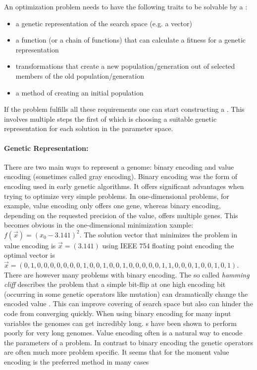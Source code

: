 An optimization problem needs to have the following traits to be solvable by a \ga:
\begin{itemize}
\item a genetic representation of the search space (e.g. a vector)
\item a function (or a chain of functions) that can calculate a fitness for a genetic representation
\item transformations that create a new population/generation out of selected members of the old population/generation
\item a method of creating an initial population
\end{itemize}


If the problem fulfills all these requirements one can start constructing a \ga. This involves multiple steps the first of which is choosing a suitable genetic representation for each solution in the parameter space. 

\paragraph{Genetic Representation:}
There are two main ways to represent a genome: binary encoding and value encoding (sometimes called gray encoding). Binary encoding was the form of encoding  used in early genetic algorithms. It offers significant advantages when trying to optimize very simple problems. In one-dimensional problems, for example, value encoding only offers one gene, whereas binary encoding, depending on the requested precision of the value, offers multiple genes. This becomes obvious in the one-dimensional minimization xample: $f(\vec{x})=(x_0 - 3.141)^2$. The solution vector that minimizes the problem in value encoding is $\vec{x} = (3.141)$ using IEEE 754 floating point encoding the optimal vector is $\vec{x}=(0,1,0,0,0,0,0,0,0,1,0,0,1,0,0,1,0,0,0,0,0,1,1,0,0,0,1,0,0,1,0,1)$.
There are however many problems with binary encoding. The so called \textit{hamming cliff} describes the problem that a simple bit-flip at one high encoding bit (occurring in some genetic operators like mutation) can dramatically change the encoded value \citep[e.g.][]{Chakraborty2003253}. This can improve covering of search space but also can hinder the code from converging quickly. When using binary encoding for many input variables the genomes can get incredibly long. \ga s have been shown to perform poorly for very long genomes. Value encoding often is a natural way to encode the parameters of a problem. In contrast to binary encoding the genetic operators are often much more problem specific. It seems that for the moment value encoding is the preferred method in many cases \citep[e.g.][]{Janikow1991Comparison,Wright91geneticalgorithms,Goldberg90real-codedgenetic}


